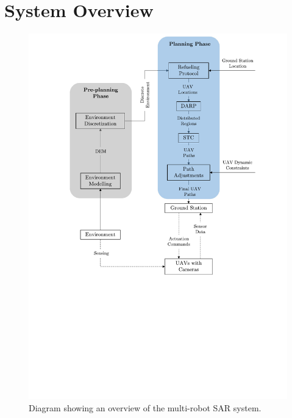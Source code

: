 \chapter{System Overview}
\label{chp:system}


\begin{figure}[h!]
	\centering
	\includegraphics[width=\textwidth,trim={3cm 8.5cm 2.5cm 0cm},clip]{figs/SOD.pdf}
	\caption{Diagram showing an overview of the multi-robot SAR system.}
	\label{fig:SOD}
\end{figure}
